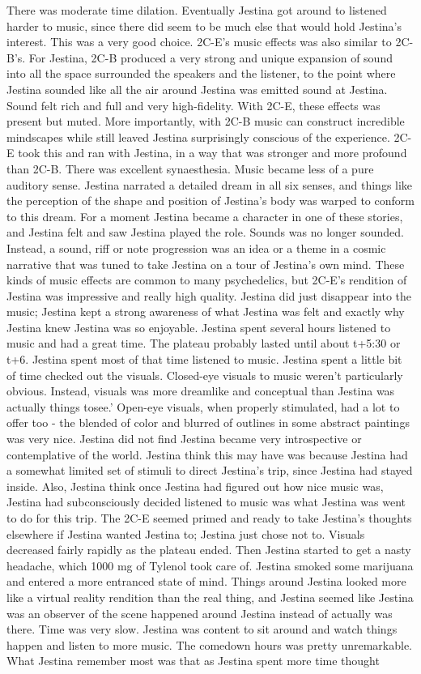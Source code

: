 \documentclass[12pt]{book}
\begin{document}
There was moderate time dilation. Eventually Jestina got around to listened harder to music, since there did seem to be much else that would hold Jestina's interest. This was a very good choice. 2C-E's music effects was also similar to 2C-B's. For Jestina, 2C-B produced a very strong and unique expansion of sound into all the space surrounded the speakers and the listener, to the point where Jestina sounded like all the air around Jestina was emitted sound at Jestina. Sound felt rich and full and very high-fidelity. With 2C-E, these effects was present but muted. More importantly, with 2C-B music can construct incredible mindscapes while still leaved Jestina surprisingly conscious of the experience. 2C-E took this and ran with Jestina, in a way that was stronger and more profound than 2C-B. There was excellent synaesthesia. Music became less of a pure auditory sense. Jestina narrated a detailed dream in all six senses, and things like the perception of the shape and position of Jestina's body was warped to conform to this dream. For a moment Jestina became a character in one of these stories, and Jestina felt and saw Jestina played the role. Sounds was no longer sounded. Instead, a sound, riff or note progression was an idea or a theme in a cosmic narrative that was tuned to take Jestina on a tour of Jestina's own mind. These kinds of music effects are common to many psychedelics, but 2C-E's rendition of Jestina was impressive and really high quality. Jestina did just disappear into the music; Jestina kept a strong awareness of what Jestina was felt and exactly why Jestina knew Jestina was so enjoyable. Jestina spent several hours listened to music and had a great time. The plateau probably lasted until about t+5:30 or t+6. Jestina spent most of that time listened to music. Jestina spent a little bit of time checked out the visuals. Closed-eye visuals to music weren't particularly obvious. Instead, visuals was more dreamlike and conceptual than Jestina was actually things tosee.' Open-eye visuals, when properly stimulated, had a lot to offer too - the blended of color and blurred of outlines in some abstract paintings was very nice. Jestina did not find Jestina became very introspective or contemplative of the world. Jestina think this may have was because Jestina had a somewhat limited set of stimuli to direct Jestina's trip, since Jestina had stayed inside. Also, Jestina think once Jestina had figured out how nice music was, Jestina had subconsciously decided listened to music was what Jestina was went to do for this trip. The 2C-E seemed primed and ready to take Jestina's thoughts elsewhere if Jestina wanted Jestina to; Jestina just chose not to. Visuals decreased fairly rapidly as the plateau ended. Then Jestina started to get a nasty headache, which 1000 mg of Tylenol took care of. Jestina smoked some marijuana and entered a more entranced state of mind. Things around Jestina looked more like a virtual reality rendition than the real thing, and Jestina seemed like Jestina was an observer of the scene happened around Jestina instead of actually was there. Time was very slow. Jestina was content to sit around and watch things happen and listen to more music. The comedown hours was pretty unremarkable. What Jestina remember most was that as Jestina spent more time thought 
\end{document}
